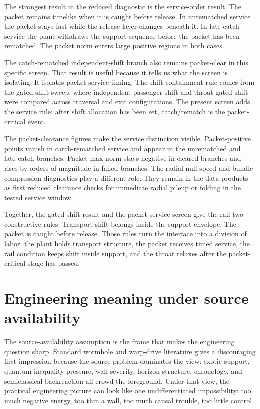 \documentclass[11pt]{article}
\begin{document}
The strongest result in the reduced diagnostic is the service-order result. The packet remains timelike when it is caught before release. In unrematched service the packet stays fast while the release layer changes beneath it. In late-catch service the plant withdraws the support sequence before the packet has been rematched. The packet norm enters large positive regions in both cases.

The catch-rematched independent-shift branch also remains packet-clear in this specific screen. That result is useful because it tells us what the screen is isolating. It isolates packet-service timing. The shift-containment rule comes from the gated-shift sweep, where independent passenger shift and throat-gated shift were compared across traversal and exit configurations. The present screen adds the service rule: after shift allocation has been set, catch/rematch is the packet-critical event.

The packet-clearance figures make the service distinction visible. Packet-positive points vanish in catch-rematched service and appear in the unrematched and late-catch branches. Packet max norm stays negative in cleared branches and rises by orders of magnitude in failed branches. The radial null-speed and bundle-compression diagnostics play a different role. They remain in the data products as first reduced clearance checks for immediate radial pileup or folding in the tested service window.

Together, the gated-shift result and the packet-service screen give the rail two constructive rules. Transport shift belongs inside the support envelope. The packet is caught before release. Those rules turn the interface into a division of labor: the plant holds transport structure, the packet receives timed service, the rail condition keeps shift inside support, and the throat relaxes after the packet-critical stage has passed.

\section{Engineering meaning under source availability}

The source-availability assumption is the frame that makes the engineering question sharp. Standard wormhole and warp-drive literature gives a discouraging first impression because the source problem dominates the view: exotic support, quantum-inequality pressure, wall severity, horizon structure, chronology, and semiclassical backreaction all crowd the foreground. Under that view, the practical engineering picture can look like one undifferentiated impossibility: too much negative energy, too thin a wall, too much causal trouble, too little control.
\end{document}

